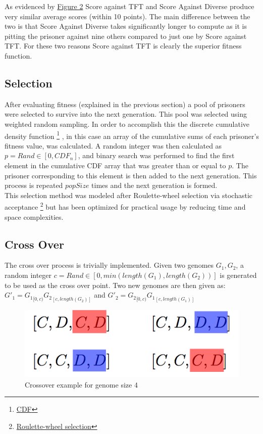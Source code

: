 \documentclass[12pt]{article}
\begin{document}
As evidenced by \hyperref[fig2]{Figure 2} Score against TFT and Score Against Diverse
produce very similar average scores (within 10 points).  The main difference
between the two is that Score Against Diverse takes significantly longer to compute
as it is pitting the prisoner against nine others compared to just one by Score against TFT.
For these two reasons Score against TFT is clearly the superior fitness function.

\subsection{Selection}

After evaluating fitness (explained in the previous section) a pool of
prisoners were selected to survive into the next generation.  This pool was
selected using weighted random sampling.  In order to accomplish this the
discrete cumulative density function
\footnote{\href{https://en.wikipedia.org/wiki/Cumulative distribution function}{CDF}}
, in this case an array of the cumulative sums of each prisoner's fitness value,
was calculated.  A random integer was then calculated as $p = Rand \in [0, CDF_n]$,
and binary search was performed to find the first element in the cumulative CDF array that
was greater than or equal to $p$.  The prisoner corresponding to this element
is then added to the next generation.  This process is repeated $popSize$ times
and the next generation is formed. \\

This selection method was modeled after Roulette-wheel selection via stochastic acceptance
\footnote{\href{http://arxiv.org/pdf/1109.3627.pdf}{Roulette-wheel selection}}
but has been optimized for practical usage by reducing time and space complexities.

\subsection{Cross Over}

The cross over process is trivially implemented.  Given two genomes $G_1, G_2$,
a random integer $c = Rand \in [0, min(length(G_1), length(G_2))]$ is generated
to be used as the cross over point.  Two new genomes are then given as:\\

$G'_1 = {G_1}_{[0,c)}{G_2}_{[c, length(G_2)]}$ and
$G'_2 = {G_2}_{[0, c)}{G_1}_{[c, length(G_1)]}$ \\

\begin{figure}[h]
    \caption{Crossover example for genome size 4}
    \centering
    \includegraphics[scale=0.5]{figures/crossover-example.png}
\end{figure}
\end{document}
